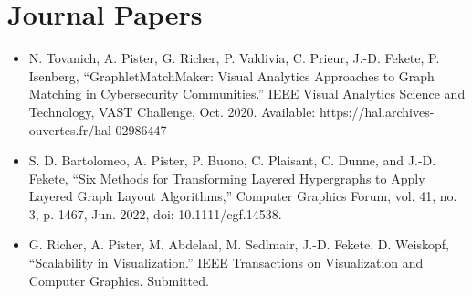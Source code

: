 \section*{Journal Papers}
\begin{itemize}
    \item N. Tovanich, A. Pister, G. Richer, P. Valdivia, C. Prieur, J.-D. Fekete, P. Isenberg, “GraphletMatchMaker: Visual Analytics Approaches to Graph Matching in Cybersecurity Communities.” IEEE Visual Analytics Science and Technology, VAST Challenge, Oct. 2020. Available: https://hal.archives-ouvertes.fr/hal-02986447
    \item S. D. Bartolomeo, A. Pister, P. Buono, C. Plaisant, C. Dunne, and J.-D. Fekete, “Six Methods for Transforming Layered Hypergraphs to Apply Layered Graph Layout Algorithms,” Computer Graphics Forum, vol. 41, no. 3, p. 1467, Jun. 2022, doi: 10.1111/cgf.14538.
    \item G. Richer, A. Pister, M. Abdelaal, M. Sedlmair, J.-D. Fekete, D. Weiskopf, ``Scalability in Visualization.'' IEEE Transactions on Visualization and Computer Graphics. Submitted.
\end{itemize}
